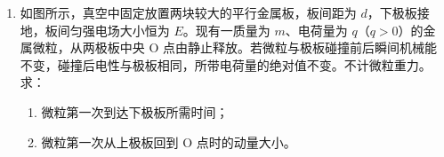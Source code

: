 \documentclass[\gkver]{gaokaozhenti}
\begin{document}
\begin{enumerate}
{（2）由于滑动变阻器采用限流式接法，应将其串联接在电路中，故采用“一上一下”原则，即电流表的“+”接线柱应与滑动变阻器的接线柱 a 相连。

为了保护电路，闭合开关前，滑动变阻器滑片应置于最大阻值处，即最左端。

（3）由题意可知，该合金丝的电阻为 $R = 3.2 \UO$

由电阻定律 $R = \rho\frac{l}{S}$ 及 $S = \pi\left(\frac{d}{2}\right)^{2}$ 可得 $\rho = \frac{\pi R d^{2}}{4l}$

其中 $d = 0.500 \Umm$，$l = 70.00 \Ucm - 20.00 \Ucm = 50.00 \Ucm$

代入数据解得该合金丝的电阻率为 $\rho \approx 1.3\times10^{-6} \UOm$

（4）根据电阻定律可知 $\rho = \frac{\pi R d^{2}}{4l}$，则为了减小实验误差，可减小测合金丝电阻时的误差，选择更精确的电阻箱，可换用阻值范围为 $0 \sim 99.99 \UO$，或多次测量该合金丝不同区间等长度样品的电阻率，再求平均值。

故选 CD。
}

\item
如图所示，真空中固定放置两块较大的平行金属板，板间距为 $d$，下极板接地，板间匀强电场大小恒为 $E$。现有一质量为 $m$、电荷量为 $q$（$q > 0$）的金属微粒，从两极板中央 O 点由静止释放。若微粒与极板碰撞前后瞬间机械能不变，碰撞后电性与极板相同，所带电荷量的绝对值不变。不计微粒重力。求：
\begin{enumerate}
	\item
	微粒第一次到达下极板所需时间；
	\item
	微粒第一次从上极板回到 O 点时的动量大小。
\end{enumerate}


\end{enumerate}
\end{document}
